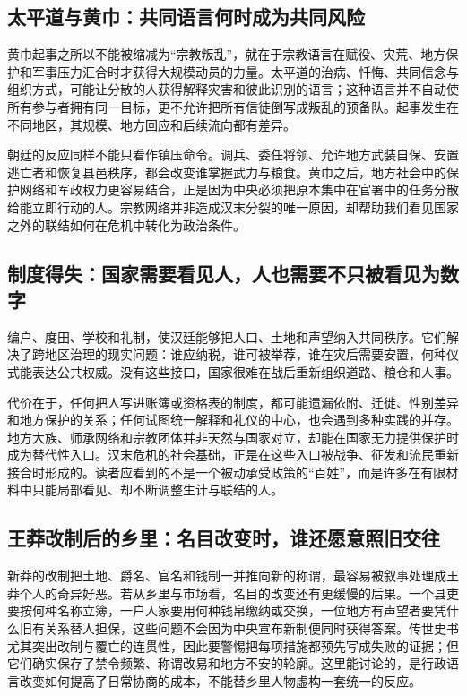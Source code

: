 \subsection{太平道与黄巾：共同语言何时成为共同风险}

黄巾起事之所以不能被缩减为“宗教叛乱”，就在于宗教语言在赋役、灾荒、地方保护和军事压力汇合时才获得大规模动员的力量。太平道的治病、忏悔、共同信念与组织方式，可能让分散的人获得解释灾害和彼此识别的语言；这种语言并不自动使所有参与者拥有同一目标，更不允许把所有信徒倒写成叛乱的预备队。起事发生在不同地区，其规模、地方回应和后续流向都有差异。

朝廷的反应同样不能只看作镇压命令。调兵、委任将领、允许地方武装自保、安置逃亡者和恢复县邑秩序，都会改变谁掌握武力与粮食。黄巾之后，地方社会中的保护网络和军政权力更容易结合，正是因为中央必须把原本集中在官署中的任务分散给能立即行动的人。宗教网络并非造成汉末分裂的唯一原因，却帮助我们看见国家之外的联结如何在危机中转化为政治条件。

\subsection{制度得失：国家需要看见人，人也需要不只被看见为数字}

编户、度田、学校和礼制，使汉廷能够把人口、土地和声望纳入共同秩序。它们解决了跨地区治理的现实问题：谁应纳税，谁可被举荐，谁在灾后需要安置，何种仪式能表达公共权威。没有这些接口，国家很难在战后重新组织道路、粮仓和人事。

代价在于，任何把人写进账簿或资格表的制度，都可能遗漏依附、迁徙、性别差异和地方保护的关系；任何试图统一解释和礼仪的中心，也会遇到多种实践的并存。地方大族、师承网络和宗教团体并非天然与国家对立，却能在国家无力提供保护时成为替代性入口。汉末危机的社会基础，正是在这些入口被战争、征发和流民重新接合时形成的。读者应看到的不是一个被动承受政策的“百姓”，而是许多在有限材料中只能局部看见、却不断调整生计与联结的人。

\subsection{王莽改制后的乡里：名目改变时，谁还愿意照旧交往}

新莽的改制把土地、爵名、官名和钱制一并推向新的称谓，最容易被叙事处理成王莽个人的奇异好恶。若从乡里与市场看，名目的改变还有更缓慢的后果。一个县吏要按何种名称立簿，一户人家要用何种钱帛缴纳或交换，一位地方有声望者要凭什么旧有关系替人担保，这些问题不会因为中央宣布新制便同时获得答案。传世史书尤其突出改制与覆亡的连贯性，因此要警惕把每项措施都预先写成失败的证据；但它们确实保存了禁令频繁、称谓改易和地方不安的轮廓。这里能讨论的，是行政语言改变如何提高了日常协商的成本，不能替乡里人物虚构一套统一的反应。

